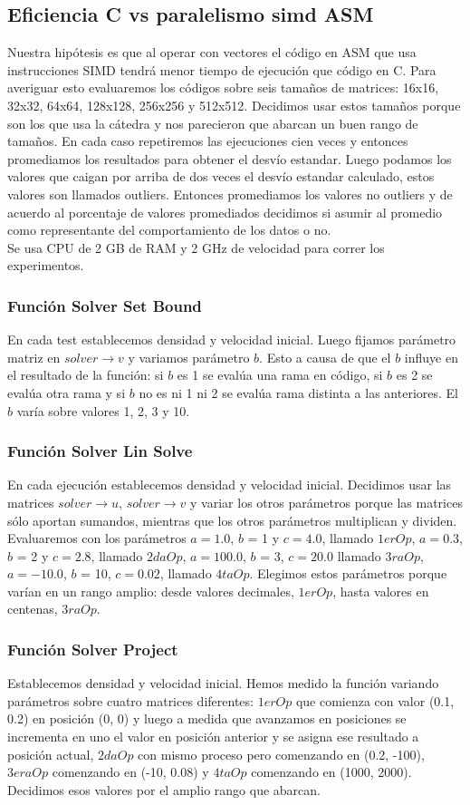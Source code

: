 \subsection{Eficiencia C vs paralelismo simd ASM}
Nuestra hipótesis es que al operar con vectores el código en ASM que usa instrucciones SIMD tendrá menor tiempo de ejecución que código en C. Para averiguar esto evaluaremos los códigos sobre seis tamaños de matrices: 16x16, 32x32, 64x64, 128x128, 256x256 y 512x512. Decidimos usar estos tamaños porque son los que usa la cátedra y nos parecieron que abarcan un buen rango de tamaños. En cada caso repetiremos las ejecuciones cien veces y entonces promediamos los resultados para obtener el desvío estandar. Luego podamos los valores que caigan por arriba de dos veces el desvío estandar calculado, estos valores son llamados outliers. Entonces promediamos los valores no outliers y de acuerdo al porcentaje de valores promediados decidimos si asumir al promedio como representante del comportamiento de los datos o no. \\
Se usa CPU de 2 GB de RAM y 2 GHz de velocidad para correr los experimentos. 
\subsubsection{Función Solver Set Bound}
En cada test establecemos densidad y velocidad inicial. Luego fijamos parámetro matriz en $solver\rightarrow v$ y variamos parámetro $b$. Esto a causa de que el $b$ influye en el resultado de la función: si $b$ es 1 se evalúa una rama en código, si $b$ es 2 se evalúa otra rama y si $b$ no es ni 1 ni 2 se evalúa rama distinta a las anteriores.
El $b$ varía sobre valores 1, 2, 3 y 10.
\subsubsection{Función Solver Lin Solve}
En cada ejecución establecemos densidad y velocidad inicial. Decidimos usar las matrices $solver\rightarrow u$, $solver\rightarrow v$ y variar los otros parámetros porque las matrices sólo aportan sumandos, mientras que los otros parámetros multiplican y dividen.
Evaluaremos con los parámetros $a = 1.0 $, $b$ = 1 y $c = 4.0$, llamado $1erOp$, $a = 0.3$, $b$ = 2 y $c = 2.8$, llamado $2daOp$, $a = 100.0$, $b$ = 3, $c = 20.0$ llamado $3raOp$, $a = -10.0$, $b$ = 10, $c = 0.02$, llamado $4taOp$. Elegimos estos parámetros porque varían en un rango amplio: desde valores decimales, $1erOp$, hasta valores en centenas, $3raOp$.

\subsubsection{Función Solver Project}
Establecemos densidad y velocidad inicial. Hemos medido la función variando parámetros sobre cuatro matrices diferentes: $1erOp$ que comienza con valor (0.1, 0.2) en posición (0, 0) y luego a medida que avanzamos en posiciones se incrementa en uno el valor en posición anterior y se asigna ese resultado a posición actual, $2daOp$ con mismo proceso pero comenzando en (0.2, -100), $3eraOp$ comenzando en (-10, 0.08) y $4taOp$ comenzando en (1000, 2000). Decidimos esos valores por el amplio rango que abarcan.

